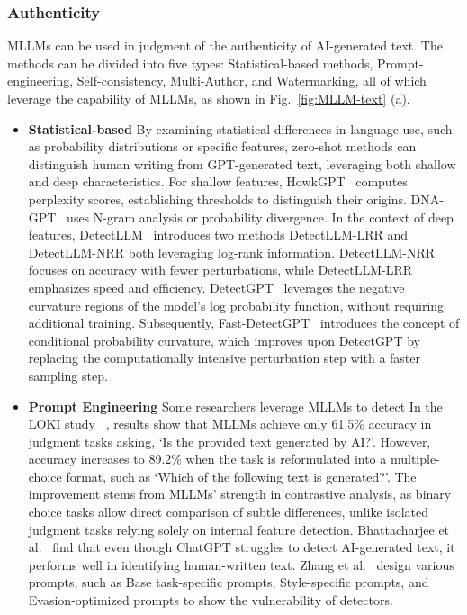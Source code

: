 \subsubsection{\textbf{Authenticity}}
MLLMs can be used in judgment of the authenticity of AI-generated text. The methods can be divided into five types: Statistical-based methods, Prompt-engineering, Self-consistency, Multi-Author, and Watermarking, all of which leverage the capability of MLLMs, as shown in Fig.~\ref{fig:MLLM-text} (a).
\begin{itemize}
\item \textbf{Statistical-based}
By examining statistical differences in language use, such as probability distributions or specific features, zero-shot methods can distinguish human writing from GPT-generated text, leveraging both shallow and deep characteristics. For shallow features, HowkGPT~\cite{vasilatos2023howkgpt} computes perplexity scores, establishing thresholds to distinguish their origins. 
DNA-GPT~\cite{yang2023dna} uses N-gram analysis or probability divergence. In the context of deep features, DetectLLM~\cite{su2023detectllm} introduces two methods DetectLLM-LRR and DetectLLM-NRR both leveraging log-rank information. DetectLLM-NRR focuses on accuracy with fewer perturbations, while DetectLLM-LRR emphasizes speed and efficiency. DetectGPT~\cite{mitchell2023detectgpt} leverages the negative curvature regions of the model's log probability function, without requiring additional training. Subsequently, Fast-DetectGPT~\cite{bao2023fast} introduces the concept of conditional probability curvature, which improves upon DetectGPT by replacing the computationally intensive perturbation step with a faster sampling step.

\item \textbf{Prompt Engineering}
Some researchers leverage MLLMs to detect In the LOKI study ~\cite{ye2024loki}, results show that MLLMs achieve only 61.5\% accuracy in judgment tasks asking, `Is the provided text generated by AI?'. However, accuracy increases to 89.2\% when the task is reformulated into a multiple-choice format, such as `Which of the following text is generated?'. The improvement stems from MLLMs' strength in contrastive analysis, as binary choice tasks allow direct comparison of subtle differences, unlike isolated judgment tasks relying solely on internal feature detection. Bhattacharjee et al.~\cite{bhattacharjee2024fighting} find that even though ChatGPT struggles to detect AI-generated text, it performs well in identifying human-written text. Zhang et al.~\cite{zhang2024detection} design various prompts, such as Base task-specific prompts, Style-specific prompts, and Evasion-optimized prompts to show the vulnerability of detectors.


\end{itemize}
